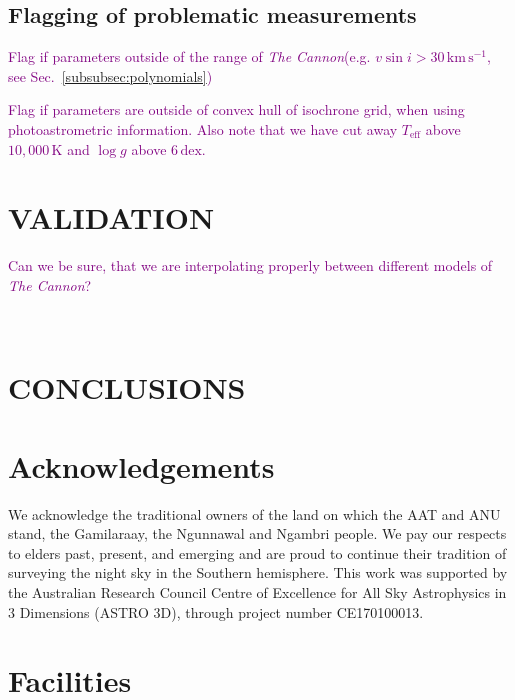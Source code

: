 \documentclass[
  journal=pasa,
  manuscript=research-paper, %
  year=2021,
  volume=37,
]{cup-journal}
\newcommand{\SB}[1]{{\textcolor{purple}{#1}}}
\newcommand{\Teff}{$T_\mathrm{eff}$\xspace}
\newcommand{\logg}{$\log g$\xspace}
\newcommand{\vsini}{$v \sin i$\xspace}
\newcommand{\TheCannon}{\textit{The Cannon}\xspace}
\newcommand{\dex}{\,\mathrm{dex}}	%
\newcommand{\K}{\,\mathrm{K}}	%
\newcommand{\kms}{\,\mathrm{km\,s^{-1}}}	%
\begin{document}
\subsection{Flagging of problematic measurements}

\SB{Flag if parameters outside of the range of \TheCannon (e.g. \vsini$ > 30 \kms$, see Sec.~\ref{subsubsec:polynomials})}

\SB{Flag if parameters are outside of convex hull of isochrone grid, when using photoastrometric information. Also note that we have cut away \Teff above $10,000\K$ and \logg above $6\dex$.}

\newpage
\section{VALIDATION} \label{sec:validation}

\SB{Can we be sure, that we are interpolating properly between different models of \TheCannon?}

\newpage $\,$ \newpage
\section{CONCLUSIONS} \label{sec:conclusion}

\section*{Acknowledgements}

We acknowledge the traditional owners of the land on which the AAT and ANU stand, the Gamilaraay, the Ngunnawal and Ngambri people. We pay our respects to elders past, present, and emerging and are proud to continue their tradition of surveying the night sky in the Southern hemisphere.
This work was supported by the Australian Research Council Centre of Excellence for All Sky Astrophysics in 3 Dimensions (ASTRO 3D), through project number CE170100013.

\section*{Facilities}
\end{document}
